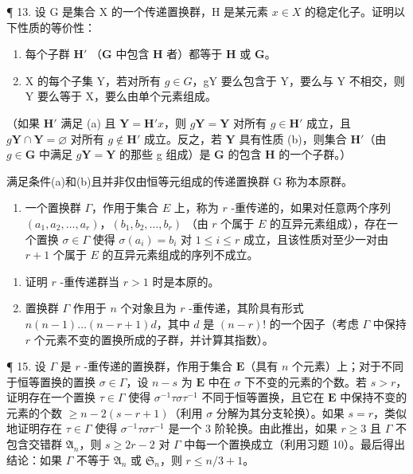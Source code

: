 ¶ 13. 设 G 是集合 X 的一个传递置换群，H 是某元素 \(x \in X\) 的稳定化子。证明以下性质的等价性：

\begin{enumerate}
\def\labelenumi{(\alph{enumi})}
\item
  每个子群 \(\mathbf{H}'\) （\(\mathbf{G}\) 中包含 \(\mathbf{H}\) 者）都等于 \(\mathbf{H}\) 或 \(\mathbf{G}\)。
\item
  X 的每个子集 Y，若对所有 \(g \in G\)，gY 要么包含于 Y，要么与 Y 不相交，则 Y 要么等于 X，要么由单个元素组成。
\end{enumerate}

（如果 \(\mathbf{H}'\) 满足 (a) 且 \(\mathbf{Y} = \mathbf{H}'x\)，则 \(g\mathbf{Y} = \mathbf{Y}\) 对所有 \(g \in \mathbf{H}'\) 成立，且 \(g\mathbf{Y} \cap \mathbf{Y} = \varnothing\) 对所有 \(g \notin \mathbf{H}'\) 成立。反之，若 \(\mathbf{Y}\) 具有性质 (b)，则集合 \(\mathbf{H}'\)（由 \(g \in \mathbf{G}\) 中满足 \(g\mathbf{Y} = \mathbf{Y}\) 的那些 g 组成）是 \(\mathbf{G}\) 的包含 \(\mathbf{H}\) 的一个子群。）

满足条件(a)和(b)且并非仅由恒等元组成的传递置换群 G 称为本原群。

\begin{enumerate}
\def\labelenumi{\arabic{enumi}。}
\setcounter{enumi}{13}
\tightlist
\item
  一个置换群 \(\Gamma\)，作用于集合 \(E\) 上，称为 \(r\) -重传递的，如果对任意两个序列 \((a_1, a_2, \ldots, a_r)\)，\((b_1, b_2, \ldots, b_r)\) （由 \(r\) 个属于 \(E\) 的互异元素组成），存在一个置换 \(\sigma \in \Gamma\) 使得 \(\sigma(a_i) = b_i\) 对 \(1 \leqslant i \leqslant r\) 成立，且该性质对至少一对由 \(r + 1\) 个属于 \(E\) 的互异元素组成的序列不成立。
\end{enumerate}

\begin{enumerate}
\def\labelenumi{(\alph{enumi})}
\item
  证明 \(r\) -重传递群当 \(r > 1\) 时是本原的。
\item
  置换群 \(\Gamma\) 作用于 \(n\) 个对象且为 \(r\) -重传递，其阶具有形式 \(n(n - 1)\ldots (n - r + 1)d\)，其中 \(d\) 是 \((n - r)!\) 的一个因子（考虑 \(\Gamma\) 中保持 \(r\) 个元素不变的置换所成的子群，并计算其指数）。
\end{enumerate}

¶ 15. 设 \(\Gamma\) 是 \(r\) -重传递的置换群，作用于集合 \(\mathbf{E}\)（具有 \(n\) 个元素）上；对于不同于恒等置换的置换 \(\sigma \in \Gamma\)，设 \(n - s\) 为 \(\mathbf{E}\) 中在 \(\sigma\) 下不变的元素的个数。若 \(s > r\)，证明存在一个置换 \(\tau \in \Gamma\) 使得 \(\sigma^{-1}\tau \sigma \tau^{-1}\) 不同于恒等置换，且它在 \(\mathbf{E}\) 中保持不变的元素的个数 \(\geqslant n - 2(s - r + 1)\)（利用 \(\sigma\) 分解为其分支轮换）。如果 \(s = r\)，类似地证明存在 \(\tau \in \Gamma\) 使得 \(\sigma^{-1}\tau \sigma \tau^{-1}\) 是一个 3 阶轮换。由此推出，如果 \(r \geqslant 3\) 且 \(\Gamma\) 不包含交错群 \(\mathfrak{A}_n\)，则 \(s \geqslant 2r - 2\) 对 \(\Gamma\) 中每一个置换成立（利用习题 10）。最后得出结论：如果 \(\Gamma\) 不等于 \(\mathfrak{A}_n\) 或 \(\mathfrak{S}_n\)，则 \(r \leqslant n/3 + 1\)。

